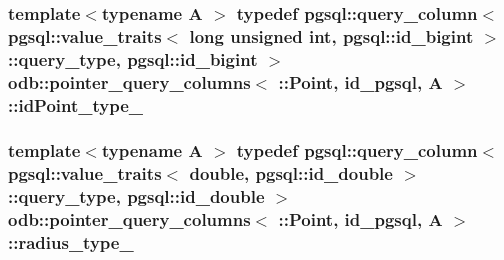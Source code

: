 \subsubsection[{id\+Point\+\_\+type\+\_\+}]{\setlength{\rightskip}{0pt plus 5cm}template$<$typename A $>$ typedef pgsql\+::query\+\_\+column$<$ pgsql\+::value\+\_\+traits$<$ long unsigned int, pgsql\+::id\+\_\+bigint $>$\+::query\+\_\+type, pgsql\+::id\+\_\+bigint $>$ odb\+::pointer\+\_\+query\+\_\+columns$<$ \+::{\bf Point}, id\+\_\+pgsql, A $>$\+::{\bf id\+Point\+\_\+type\+\_\+}}\label{structodb_1_1pointer__query__columns_3_01_1_1_point_00_01id__pgsql_00_01_a_01_4_ab040a049d0d3ee3f9aa48ed84b384cba}
\hypertarget{structodb_1_1pointer__query__columns_3_01_1_1_point_00_01id__pgsql_00_01_a_01_4_aa0748d827e6d7d2cfa8c1279510f6cb4}{}
\subsubsection[{radius\+\_\+type\+\_\+}]{\setlength{\rightskip}{0pt plus 5cm}template$<$typename A $>$ typedef pgsql\+::query\+\_\+column$<$ pgsql\+::value\+\_\+traits$<$ double, pgsql\+::id\+\_\+double $>$\+::query\+\_\+type, pgsql\+::id\+\_\+double $>$ odb\+::pointer\+\_\+query\+\_\+columns$<$ \+::{\bf Point}, id\+\_\+pgsql, A $>$\+::{\bf radius\+\_\+type\+\_\+}}\label{structodb_1_1pointer__query__columns_3_01_1_1_point_00_01id__pgsql_00_01_a_01_4_aa0748d827e6d7d2cfa8c1279510f6cb4}
\hypertarget{structodb_1_1pointer__query__columns_3_01_1_1_point_00_01id__pgsql_00_01_a_01_4_a613de48a47de6c39f97cd5541b8df5f6}{}
